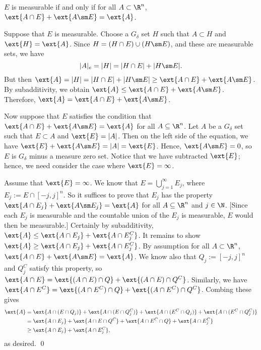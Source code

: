 \begin{thm} \label{thm:cara}
$E$ is measurable if and only if for all $A \subset \R^n$, $\ext{A \cap E}+\ext{A\sm E}=\ext{A}$.
\end{thm}

\pf Suppose that $E$ is measurable. Choose a $G_\delta$ set $H$ such that $A \subset H$ and $\ext{H}=\ext{A}$. Since $H= (H \cap E) \cup (H \sm E)$, and these are measurable sets, we have
	\[
	|A|_e=|H|= |H \cap E| + |H \sm E|.
	\]
But then $\ext{A} = |H|= |H \cap E| + |H\sm E| \geq \ext{A \cap E} + \ext{A \sm E}$. By subadditivity, we obtain $\ext{A} \leq \ext{A \cap E} + \ext{A \sm E}$. Therefore, $\ext{A}= \ext{A \cap E} + \ext{A \sm E}$.

Now suppose that $E$ satisfies the condition that $\ext{A \cap E}+\ext{A\sm E}=\ext{A}$ for all $A \subseteq \R^n$. Let $A$ be a $G_\delta$ set such that $E \subset A$ and $\ext{E}=|A|$. Then on the left side of the equation, we have $\ext{E}+\ext{A\sm E}= |A|=\ext{E}$. Hence, $\ext{A \sm E}=0$, so $E$ is $G_\delta$ minus a measure zero set. Notice that we have subtracted $\ext{E}$; hence, we need consider the case where $\ext{E}=\infty$.

Assume that $\ext{E}=\infty$. We know that $E= \bigcup_{j=1}^\infty E_j$, where $E_j:= E \cap [-j,j]^n$. So it suffices to prove that $E_j$ has the property $\ext{A \cap E_j}+\ext{A\sm E_j}=\ext{A}$ for all $A \subseteq \R^n$ and $j \in \N$. [Since each $E_j$ is measurable and the countable union of the $E_j$ is measurable, $E$ would then be measurable.] Certainly by subadditivity, $\ext{A} \leq  \ext{A \cap E_j} + \ext{A \cap E_j^C}$. It remains to show $\ext{A} \geq  \ext{A \cap E_j} + \ext{A \cap E_j^C}$. By assumption for all $A \subset \R^n$, $\ext{A \cap E}+\ext{A\sm E}=\ext{A}$. We know also that $Q_j:= [-j,j]^n$ and $Q_j^C$ satisfy this property, so $\ext{A \cap E}= \ext{(A \cap E) \cap Q}+ \ext{(A \cap E) \cap Q^C}$. Similarly, we have $\ext{A \cap E^C}= \ext{(A \cap E^C) \cap Q}+ \ext{(A \cap E^C) \cap Q^C}$. Combing these gives
	\[
	\begin{split}
	\ext{A}&= \ext{A \cap (E \cap Q_j)} + \ext{A \cap (E \cap Q_j^C)} + \ext{A \cap (E^C \cap Q_j)}+ \ext{A \cap (E^C \cap Q_j^C)} \\
	&= \ext{A \cap E_j} + \ext{A \cap E \cap Q^C} + \ext{A \cap E^C \cap Q}+ \ext{A \cap E_j^C} \\ 
	&\geq \ext{A \cap E_j} + \ext{A \cap E_j^C},
	\end{split}
	\]
as desired. \qed \\


